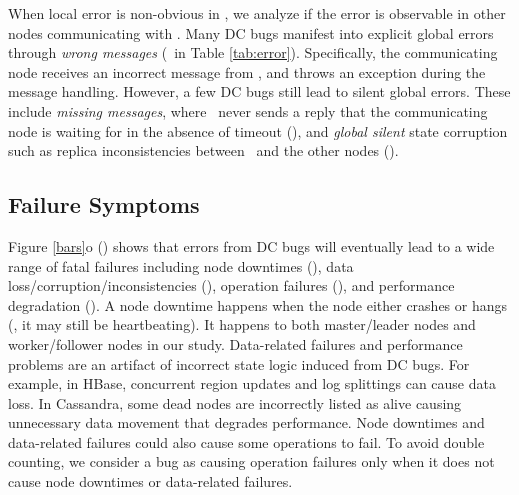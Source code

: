 

When local error is non-obvious in \nt, we analyze if the error is
observable in other nodes communicating with \nt.  Many
DC bugs manifest into explicit global errors through {\em wrong
messages} (\pctErrGlobWrong\ in Table \ref{tab:error}). Specifically, 
the communicating
node receives an incorrect message from \nt, and throws an exception
during the message handling.  However, a few DC bugs still lead to
silent global errors. These include {\em missing messages}, where
\nt\ never sends a reply that the communicating node is waiting for
in the absence of timeout (\pctErrGlobMiss), and {\em global
  silent} state corruption such as replica inconsistencies
between \nt\ and the other nodes (\pctErrGlobSil).










\subsection{Failure Symptoms}
\label{err-fail}






Figure \ref{bars}o (\BFAIL) shows that errors from DC bugs will
eventually lead to a wide range of fatal failures including
%
node downtimes (\pctFailNode),
data loss/corruption/inconsistencies (\pctFailData),
operation failures (\pctFailOp),
and performance degradation (\pctFailPer).
%
A node downtime happens when the node either crashes or
hangs (\ie, it may still be heartbeating).
It happens to both master/leader nodes and worker/follower nodes
in our study.
%
Data-related failures and performance problems are an artifact of
incorrect state logic induced from DC bugs.  For example, in HBase,
concurrent region updates and log splittings can cause data loss.
In Cassandra, some dead nodes are incorrectly listed as alive causing
unnecessary data movement that degrades performance.
% 
Node downtimes and data-related failures could also cause some operations
to fail.  To avoid double counting,
we consider a bug as causing operation failures only when it does not cause
node downtimes or data-related failures.

\fi






